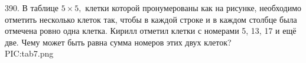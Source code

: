 390. В таблице $5\times5,$ клетки которой пронумерованы как на рисунке, необходимо отметить несколько клеток так, чтобы в каждой строке и в каждом столбце была отмечена ровно одна клетка. Кирилл отметил клетки с номерами 5, 13, 17 и ещё две. Чему может быть равна сумма номеров этих двух клеток?\\
{{PIC:tab7.png}}\\
